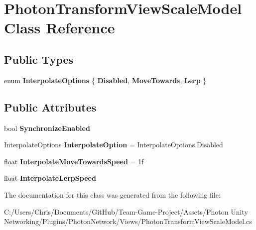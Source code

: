 \hypertarget{class_photon_transform_view_scale_model}{}\section{Photon\+Transform\+View\+Scale\+Model Class Reference}
\label{class_photon_transform_view_scale_model}
\subsection*{Public Types}
\begin{DoxyCompactItemize}
\item 
enum {\bfseries Interpolate\+Options} \{ {\bfseries Disabled}, 
{\bfseries Move\+Towards}, 
{\bfseries Lerp}
 \}\hypertarget{class_photon_transform_view_scale_model_a08ebb1a595144712993238495531432e}{}\label{class_photon_transform_view_scale_model_a08ebb1a595144712993238495531432e}

\end{DoxyCompactItemize}
\subsection*{Public Attributes}
\begin{DoxyCompactItemize}
\item 
bool {\bfseries Synchronize\+Enabled}\hypertarget{class_photon_transform_view_scale_model_a22b3360da0a4aa09e0086af1ae091da2}{}\label{class_photon_transform_view_scale_model_a22b3360da0a4aa09e0086af1ae091da2}

\item 
Interpolate\+Options {\bfseries Interpolate\+Option} = Interpolate\+Options.\+Disabled\hypertarget{class_photon_transform_view_scale_model_a9680982f5a84536b57ae3f806291ab37}{}\label{class_photon_transform_view_scale_model_a9680982f5a84536b57ae3f806291ab37}

\item 
float {\bfseries Interpolate\+Move\+Towards\+Speed} = 1f\hypertarget{class_photon_transform_view_scale_model_ac326b99330c3bcfe8df598893a2f3261}{}\label{class_photon_transform_view_scale_model_ac326b99330c3bcfe8df598893a2f3261}

\item 
float {\bfseries Interpolate\+Lerp\+Speed}\hypertarget{class_photon_transform_view_scale_model_a7fd5e6b606026fb096e79391b587a66b}{}\label{class_photon_transform_view_scale_model_a7fd5e6b606026fb096e79391b587a66b}

\end{DoxyCompactItemize}


The documentation for this class was generated from the following file\+:\begin{DoxyCompactItemize}
\item 
C\+:/\+Users/\+Chris/\+Documents/\+Git\+Hub/\+Team-\/\+Game-\/\+Project/\+Assets/\+Photon Unity Networking/\+Plugins/\+Photon\+Network/\+Views/Photon\+Transform\+View\+Scale\+Model.\+cs\end{DoxyCompactItemize}
